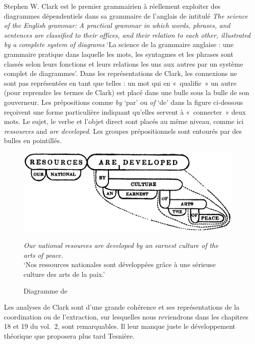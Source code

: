 {    Stephen W. Clark est le premier grammairien à réellement exploiter des diagrammes dépendentiels dans sa grammaire de l’anglais de \citeyear{Clark1847} intitulé \textit{The science of the English grammar: A practical grammar in which words, phrases, and sentences are classified to their offices, and their relation to each other, illustrated by a complete system of diagrams} ‘La science de la grammaire anglaise : une grammaire pratique dans laquelle les mots, les syntagmes et les phrases sont classés selon leurs fonctions et leurs relations les uns aux autres par un système complet de diagrammes’. Dans les représentations de Clark, les connexions ne sont pas représentées en tant que telles : un mot qui en «~qualifie~» un autre (pour reprendre les termes de Clark) est placé dans une bulle sous la bulle de son gouverneur. Les prépositions comme \textit{by} ‘par’ ou \textit{of} ‘de’ dans la figure ci-dessous reçoivent une forme particulière indiquant qu’elles servent à «~connecter~» deux mots. Le sujet, le verbe et l’objet direct sont placés au même niveau, comme ici \textit{ressources} and \textit{are developed}. Les groupes prépositionnels sont entourés par des bulles en pointillés.

    \begin{figure}[H]
    \caption{Diagramme de \citet[17]{Clark1847}}
    \includegraphics[width=.75\textwidth]{figures/Clark1847.png}\smallskip\\    
    \noindent\parbox{.75\textwidth}{\small\textit{Our national resources are developed by an earnest culture of the arts of peace.}\\
    ‘Nos ressources nationales sont développées grâce à une sérieuse culture des arts de la paix.’}
    \end{figure}

    Les analyses de Clark sont d’une grande cohérence et ses représentations de la coordination ou de l’extraction, sur lesquelles nous reviendrons dans les chapitres 18 et 19 du vol.\ 2, sont remarquables. Il leur manque juste le développement théorique que proposera plus tard Tesnière.%

}
